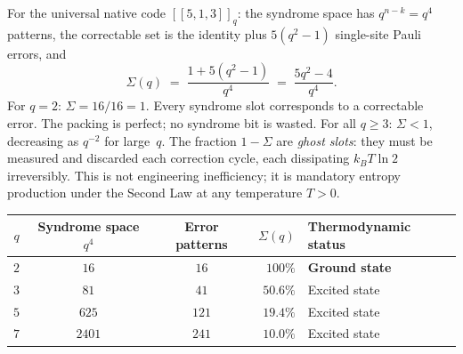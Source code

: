 \documentclass[11pt,a4paper]{article}
\newcommand{\Cq}[4]{[\![#1,#2,#3]\!]_{#4}}
\begin{document}
For the universal native code $\Cq{5}{1}{3}{q}$: the syndrome space has $q^{n-k}=q^4$ patterns, the correctable set is the identity plus $5(q^2-1)$ single-site Pauli errors, and
\begin{equation}
  \Sigma(q) \;=\; \frac{1+5(q^2-1)}{q^4}
  \;=\; \frac{5q^2-4}{q^4}.
  \label{eq:Sigma}
\end{equation}
For $q=2$: $\Sigma = 16/16 = 1$. Every syndrome slot corresponds to a correctable error. The packing is perfect; no syndrome bit is wasted. For all $q\geq3$: $\Sigma<1$, decreasing as $q^{-2}$ for large~$q$. The fraction $1-\Sigma$ are \emph{ghost slots}: they must be measured and discarded each correction cycle, each dissipating $k_BT\ln2$ irreversibly. This is not engineering inefficiency; it is mandatory entropy production under the Second Law at any temperature $T>0$.

\begin{center}
\renewcommand{\arraystretch}{1.25}
\begin{tabular}{cccrl}
\toprule
$q$ & Syndrome space $q^4$ & Error patterns & $\Sigma(q)$ & Thermodynamic status \\
\midrule
$2$ & $16$   & $16$  & $100\%$ & \textbf{Ground state} \\
$3$ & $81$   & $41$  & $50.6\%$ & Excited state \\
$5$ & $625$  & $121$ & $19.4\%$ & Excited state \\
$7$ & $2401$ & $241$ & $10.0\%$ & Excited state \\
\bottomrule
\end{tabular}
\end{center}
\end{document}
